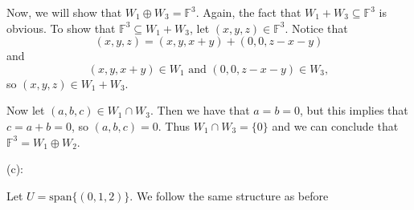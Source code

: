 \documentclass{article}
\theoremstyle{plain} %
\numberwithin{thm}{section} %
\theoremstyle{definition}
\begin{document}
\begin{question}{8}
        Now, we will show that \(W_1 \oplus W_3 = \mathbb{F}^3\). Again, the fact that \(W_1 + W_3 \subseteq \mathbb{F}^3\) is obvious. To show that \(\mathbb{F}^3 \subseteq W_1 + W_3\), let \((x,y,z) \in \mathbb{F}^3\). Notice that
        \[
            (x,y,z) = (x,y,x+y) + (0, 0, z - x - y)
        \]
        and
        \[
            (x,y,x+y) \in W_1 \text{ and } (0,0,z-x-y) \in W_3,
        \]
        so \((x,y,z) \in W_1 + W_3\).

        Now let \((a,b,c) \in W_1 \cap W_3\). Then we have that \(a = b = 0\), but this implies that \(c = a + b = 0\), so \((a,b,c) = 0\). Thus \(W_1 \cap W_3 = \{ 0 \}\) and we can conclude that \(\mathbb{F}^3 = W_1 \oplus W_2\).

        \medskip

        (c):

        Let \(U = \mathrm{span} \{ (0,1,2) \}\). We follow the same structure as before
    \end{question}
    \newpage
\end{document}
